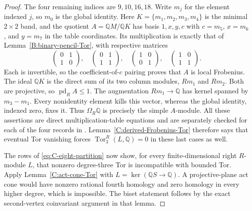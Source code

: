 \begin{proof}
The four remaining indices are $9,10,16,18$.
Write $m_j$ for the element indexed $j$, so $m_0$ is the
global identity. Here $K=\{m_1,m_2,m_3,m_4\}$ is the minimal
$2\times2$ band, and
the quotient $A=\mathbb QM/\mathbb QK$ has basis $1,x,y,c$
with $c=m_5$, $x=m_6$, and $y=m_7$ in the table coordinates.
Its multiplication is exactly that of
Lemma~\ref{B:binary-pencil-Tor}, with respective matrices
\[
 \begin{pmatrix}0&1\\1&0\end{pmatrix},\quad
 \begin{pmatrix}0&1\\1&1\end{pmatrix},\quad
 \begin{pmatrix}1&0\\0&1\end{pmatrix},\quad
 \begin{pmatrix}1&0\\1&1\end{pmatrix}.
\]
Each is invertible, so the coefficient-of-$c$ pairing proves
that $A$ is local Frobenius. The ideal $\mathbb QK$ is the
direct sum of its two column modules, $Rm_1$ and $Rm_2$.
Both are projective, so
$\operatorname{pd}_R A\leq1$.
The augmentation $Rm_1\to\mathbb Q$ has kernel spanned by
$m_3-m_1$. Every nonidentity element kills this vector, whereas
the global identity, indexed zero, fixes it. Thus
$\Omega_R\mathbb Q$ is precisely the simple $A$-module.
All these assertions are direct multiplication-table equations
and are separately checked for each of the four records in
.
Lemma~\ref{C:derived-Frobenius-Tor} therefore says that eventual
Tor vanishing forces $\operatorname{Tor}_3^R(L,\mathbb Q)=0$
in these last cases as well.

The rows of \eqref{eq:C-eight-partition} now show, for every
finite-dimensional right
$R$-module $L$, that nonzero degree-three Tor is incompatible
with bounded Tor. Apply Lemma~\ref{C:act-cone-Tor} with
$L=\ker(\mathbb QS\to\mathbb Q)$. A projective-plane act cone
would have nonzero rational fourth homology and zero homology
in every higher degree, which is impossible.
The biset statement follows by the exact second-vertex
coinvariant argument in that lemma.
\end{proof}
